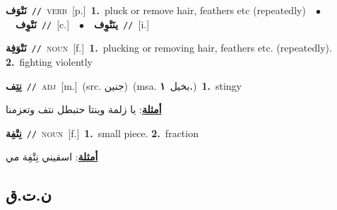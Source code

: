 \documentclass[10pt,a4paper,twoside]{article} %
\begin{document}
\begin{multicols}{2}
{\setlength\topsep{0pt}\textbf{\foreignlanguage{arabic}{نَتْوَف}}\ {\color{gray}\texttt{//}\color{black}}\ \textsc{verb}\ [p.]\ \textbf{1.}~pluck or remove hair, feathers etc (repeatedly)\ \ $\bullet$\ \ \setlength\topsep{0pt}\textbf{\foreignlanguage{arabic}{نَتْوِف}}\ {\color{gray}\texttt{//}\color{black}}\ [c.]\ \ $\bullet$\ \ \setlength\topsep{0pt}\textbf{\foreignlanguage{arabic}{ينَتْوِف}}\ {\color{gray}\texttt{//}\color{black}}\ [i.]\ } \vspace{2mm}

{\setlength\topsep{0pt}\textbf{\foreignlanguage{arabic}{نَتْوَفِة}}\ {\color{gray}\texttt{//}\color{black}}\ \textsc{noun}\ [f.]\ \textbf{1.}~plucking or removing hair, feathers etc. (repeatedly).  \textbf{2.}~fighting violently\ } \vspace{2mm}

{\setlength\topsep{0pt}\textbf{\foreignlanguage{arabic}{نِتِف}}\ {\color{gray}\texttt{//}\color{black}}\ \textsc{adj}\ [m.]\ (src. \color{gray}\foreignlanguage{arabic}{جنين}\color{black})\ \color{gray}(msa. \foreignlanguage{arabic}{بخيل}~\foreignlanguage{arabic}{\textbf{١.}})\color{black}\ \textbf{1.}~stingy\  \begin{flushright}\color{gray}\foreignlanguage{arabic}{\textbf{\underline{\foreignlanguage{arabic}{أمثلة}}}: يا زلمة وينتا حتبطل نتف وتعزمنا}\end{flushright}\color{black}} \vspace{2mm}

{\setlength\topsep{0pt}\textbf{\foreignlanguage{arabic}{نِتْفِة}}\ {\color{gray}\texttt{//}\color{black}}\ \textsc{noun}\ [f.]\ \textbf{1.}~small piece.  \textbf{2.}~fraction\  \begin{flushright}\color{gray}\foreignlanguage{arabic}{\textbf{\underline{\foreignlanguage{arabic}{أمثلة}}}: اسقيني نِتْفِة مي}\end{flushright}\color{black}} \vspace{2mm}

\vspace{-3mm}
\subsection*{\color{blue}\foreignlanguage{arabic}{ن.ت.ق}\color{blue}{}} 


\end{multicols}
\end{document}
